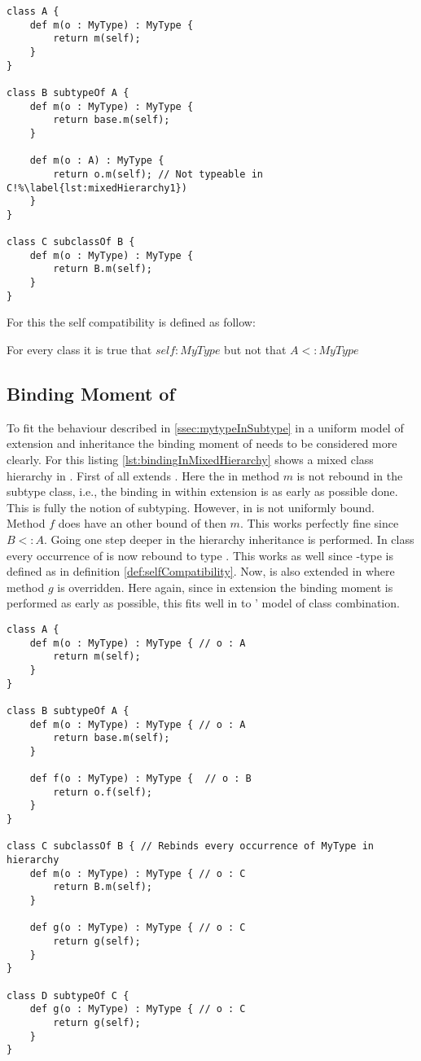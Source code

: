 \begin{lstlisting}[float,language=ooplss,caption=Mixed extension and inheritance hierarchy,label=lst:mixedHierarchy]
class A {
	def m(o : MyType) : MyType {
		return m(self);
	}
}

class B subtypeOf A {
	def m(o : MyType) : MyType {
		return base.m(self);
	}

	def m(o : A) : MyType { 
		return o.m(self); // Not typeable in C!%\label{lst:mixedHierarchy1})
	}
}

class C subclassOf B {
	def m(o : MyType) : MyType {
		return B.m(self);
	}
}
\end{lstlisting}

For this the self compatibility is defined as follow:

\begin{defn}
	\label{def:selfCompatibility}
	For every class \A it is true that $self : MyType$ but not that $A <: MyType$
\end{defn}

\subsection{Binding Moment of \mytype}
To fit the behaviour described in \cref{ssec:mytypeInSubtype} in
a uniform model of extension and inheritance the binding moment
of \mytype needs to be considered more clearly. For this listing
\ref{lst:bindingInMixedHierarchy} shows a mixed class hierarchy in
\ooplss. First of all \B extends \A. Here the \mytype in method $m$ is
not rebound in the subtype class, i.e., the \mytype binding in within
extension is as early as possible done. This is fully the notion of
subtyping. However, in \B is \mytype not uniformly bound. Method $f$
does have an other bound of \mytype then $m$. This works perfectly fine
since $B <: A$. Going one step deeper in the hierarchy inheritance is
performed. In class \C every occurrence of \mytype is now rebound to
type \C. This works as well since \self-type is defined as in definition
\ref{def:selfCompatibility}. Now, \C is also extended in \D where method
$g$ is overridden. Here again, since in extension the binding moment is
performed as early as possible, this fits well in to \ooplss' model of
class combination.

\begin{lstlisting}[float,language=ooplss,caption=Binding of \self and \mytype in a mixed context,label=lst:bindingInMixedHierarchy]
class A {
	def m(o : MyType) : MyType { // o : A
		return m(self); 
	}
}

class B subtypeOf A {
	def m(o : MyType) : MyType { // o : A
		return base.m(self);
	}

	def f(o : MyType) : MyType {  // o : B
		return o.f(self); 
	}
}

class C subclassOf B { // Rebinds every occurrence of MyType in hierarchy
	def m(o : MyType) : MyType { // o : C
		return B.m(self);
	}

	def g(o : MyType) : MyType { // o : C
		return g(self);
	}
}

class D subtypeOf C {
	def g(o : MyType) : MyType { // o : C
		return g(self);
	}
}
\end{lstlisting}

